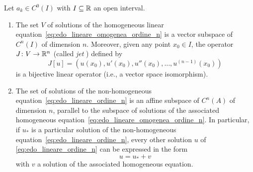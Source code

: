 \begin{theorem}%
\label{th:edo_lineare_ordine_n}%
\mymark{***}%
Let $a_k\in C^0(I)$ with $I\subseteq {\mathbb R}$
an open interval.

\begin{enumerate}
\item
The set $V$ of solutions of the homogeneous linear
equation~\eqref{eq:edo_lineare_omogenea_ordine_n}
is a vector subspace of $C^n(I)$ of dimension $n$.
Moreover, given any point $x_0\in I$, the operator $J\colon V \to {\mathbb R}^n$
(called \emph{jet}%
) defined by
\begin{equation}\label{eq:jet}
  J[u] = (u(x_0), u'(x_0), u''(x_0), \dots, u^{(n-1)}(x_0))
\end{equation}
is a bijective linear operator (i.e., a vector space isomorphism).

\item
The set of solutions of the non-homogeneous
equation~\eqref{eq:edo_lineare_ordine_n}
is an affine subspace of $C^n(A)$ of dimension $n$,
parallel to the subspace of solutions of the associated homogeneous
equation~\eqref{eq:edo_lineare_omogenea_ordine_n}.
In particular, if $u_*$ is a particular solution of the non-homogeneous
equation~\eqref{eq:edo_lineare_ordine_n}, every other solution $u$ of
\eqref{eq:edo_lineare_ordine_n} can be expressed in the form
\[
  u = u_* + v
\]
with $v$ a solution of the associated homogeneous equation.
\end{enumerate}
\end{theorem}
%
